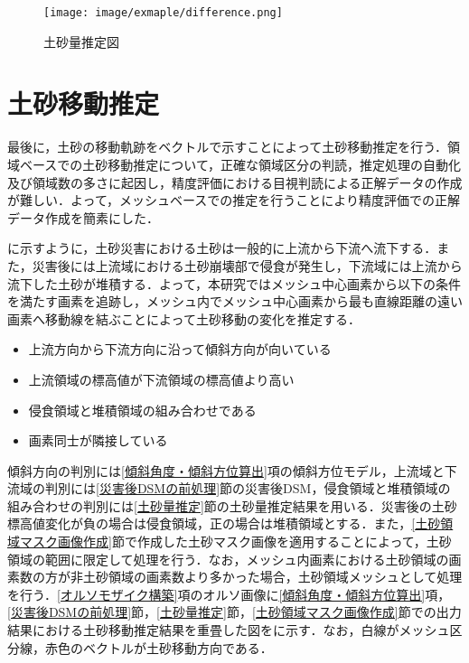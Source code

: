     \begin{figure}[tbp]
      \centering
      \texttt{[image: image/exmaple/difference.png]}
      \caption{土砂量推定図}
      \label{土砂量推定結果}
    \end{figure}



  \section{土砂移動推定}
    \label{土砂移動推定}
    最後に，土砂の移動軌跡をベクトルで示すことによって土砂移動推定を行う．領域ベースでの土砂移動推定について，正確な領域区分の判読，推定処理の自動化及び領域数の多さに起因し，精度評価における目視判読による正解データの作成が難しい．よって，メッシュベースでの推定を行うことにより精度評価での正解データ作成を簡素にした．

    に示すように，土砂災害における土砂は一般的に上流から下流へ流下する．また，災害後には上流域における土砂崩壊部で侵食が発生し，下流域には上流から流下した土砂が堆積する\cite{土砂量解析5}．よって，本研究ではメッシュ中心画素から以下の条件を満たす画素を追跡し，メッシュ内でメッシュ中心画素から最も直線距離の遠い画素へ移動線を結ぶことによって土砂移動の変化を推定する．

    \begin{itemize}
      \setlength{\itemsep}{-5pt}
      \item 上流方向から下流方向に沿って傾斜方向が向いている
      \item 上流領域の標高値が下流領域の標高値より高い
      \item 侵食領域と堆積領域の組み合わせである
      \item 画素同士が隣接している
    \end{itemize}

    傾斜方向の判別には\ref{傾斜角度・傾斜方位算出}項の傾斜方位モデル，上流域と下流域の判別には\ref{災害後DSMの前処理}節の災害後DSM，侵食領域と堆積領域の組み合わせの判別には\ref{土砂量推定}節の土砂量推定結果を用いる．災害後の土砂標高値変化が負の場合は侵食領域，正の場合は堆積領域とする．また，\ref{土砂領域マスク画像作成}節で作成した土砂マスク画像を適用することによって，土砂領域の範囲に限定して処理を行う．なお，メッシュ内画素における土砂領域の画素数の方が非土砂領域の画素数より多かった場合，土砂領域メッシュとして処理を行う．\ref{オルソモザイク構築}項のオルソ画像に\ref{傾斜角度・傾斜方位算出}項，\ref{災害後DSMの前処理}節，\ref{土砂量推定}節，\ref{土砂領域マスク画像作成}節での出力結果における土砂移動推定結果を重畳した図をに示す．なお，白線がメッシュ区分線，赤色のベクトルが土砂移動方向である．
    
